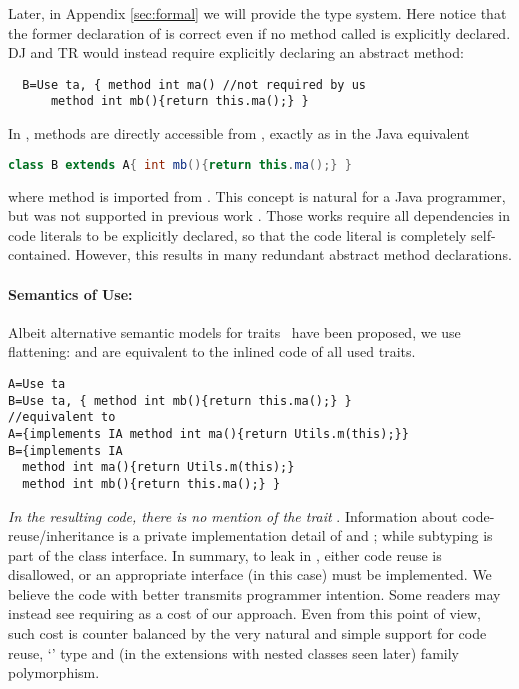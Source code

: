 Later, in Appendix \ref{sec:formal} we will provide the type
system. 
Here notice that the former declaration of \Q@B@ is correct even if
no method called \Q@ma@ is explicitly declared.
DJ and TR would instead require explicitly declaring an abstract \Q@ma@ method:
\saveSpace\saveSpace
\begin{lstlisting}
  B=Use ta, { method int ma() //not required by us
      method int mb(){return this.ma();} }
\end{lstlisting}
\saveSpace\saveSpace
\noindent
In \name, methods are directly accessible from \Q@ta@, exactly as in the Java equivalent
\saveSpace\saveSpace\begin{lstlisting}[language=Java]
  class B extends A{ int mb(){return this.ma();} }  
\end{lstlisting}
\saveSpace\saveSpace
where method \Q@ma@ is imported from \Q@A@.
This concept is natural for a Java programmer, but was not supported
in previous work \cite{BETTINI2013521,deep}. Those works require all
dependencies in code literals to be explicitly declared, so that the
code literal is completely self-contained. However, this results in
many redundant abstract method declarations.

\paragraph{Semantics of Use:}
Albeit alternative semantic models for traits~\cite{lagorio2009featherweight} have been proposed,
we use flattening: \Q@A@ and \Q@B@ are equivalent to the inlined code of all used traits{.}%
\saveSpace\saveSpace\begin{lstlisting}
A=Use ta
B=Use ta, { method int mb(){return this.ma();} }
//equivalent to
A={implements IA method int ma(){return Utils.m(this);}}
B={implements IA
  method int ma(){return Utils.m(this);}
  method int mb(){return this.ma();} } 
 \end{lstlisting}
\saveSpace\saveSpace
\emph{In the resulting code, there is no mention of the trait
 \Q@ta@}. Information about code-reuse/inheritance
  is a private implementation detail of \Q@A@
 and \Q@B@; while subtyping is part of the class interface.
In summary, to leak \Q@this@ in \name, either code reuse is disallowed, or an appropriate interface (\Q@IA@ in this case) must be implemented.
We believe the code with \Q@IA@ better transmits programmer intention. Some
readers may instead see requiring \Q@IA@ as a cost of our approach.
Even from this point of view, such cost is counter balanced by 
the very natural and simple support for code reuse, `\Q@This@' type and (in the extensions with nested classes seen later)
family polymorphism.






